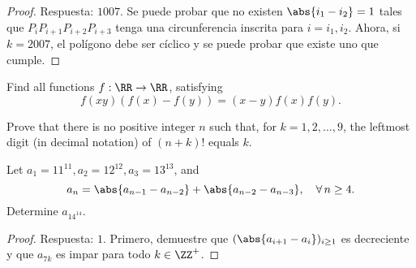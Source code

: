 \begin{proof}
	Respuesta: $1007$. Se puede probar que no existen $\abs{i_1-i_2}=1$ tales que $P_iP_{i+1}P_{i+2}P_{i+3}$ tenga una circunferencia inscrita para $i=i_1,i_2$. Ahora, si $k=2007$, el polígono debe ser cíclico y se puede probar que existe uno que cumple.
\end{proof}


\begin{problem}
	Find all functions $f:\RR\to\RR$, satisfying
	\[f(xy)(f(x)-f(y))=(x-y)f(x)f(y).\]
\end{problem}


\begin{probEG}
	Prove that there is no positive integer $n$ such that, for $k=1,2,\dots,9$, the leftmost digit (in decimal notation) of $(n+k)!$ equals $k$.
\end{probEG}

\begin{probMR}
	Let $a_1=11^{11},a_2=12^{12},a_3=13^{13}$, and
	\[a_n=\abs{a_{n-1}-a_{n-2}}+\abs{a_{n-2}-a_{n-3}},\quad\forall\,n\ge 4.\]
	Determine $a_{14^{14}}$.
\end{probMR}

\begin{proof}
	Respuesta: $1$. Primero, demuestre que $(\abs{a_{i+1}-a_i})_{i\ge 1}$ es decreciente y que $a_{7k}$ es impar para todo $k\in\ZZ^+$.
\end{proof}
